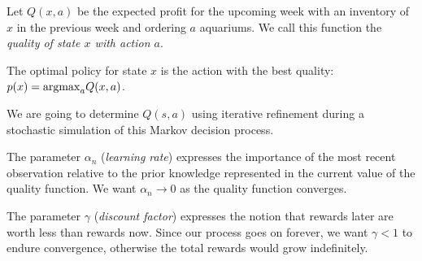 \begin{SaveDefinition}[key=Q-learning, title ={Q-learning Algorithm}]
	
Let $Q(x,a)$ be the expected profit for the upcoming week with an inventory of $x$ in the previous week and ordering $a$ aquariums.
We call this function the \textit{quality of state $x$ with action $a$}.

The optimal policy for state $x$ is the action with the best quality: $\displaystyle p(x) = {\rm argmax}_a Q(x,a)$.

We are going to determine $Q(s,a)$ using iterative refinement during a stochastic simulation of this Markov decision process.

\begin{algorithm}[H]
	\SetAlgoLined\SetArgSty{}
\end{algorithm}

The parameter $\alpha_n$ (\textit{learning rate}) expresses the importance of the most recent observation relative to the prior knowledge represented in the current value of the quality function. We want $\alpha_n \to 0$ as the quality function converges.

The parameter $\gamma$ (\textit{discount factor}) expresses the notion that rewards later are worth less than rewards now. Since our process goes on forever, we want $\gamma <1$ to endure convergence, otherwise the total rewards would grow indefinitely.

\end{SaveDefinition}




